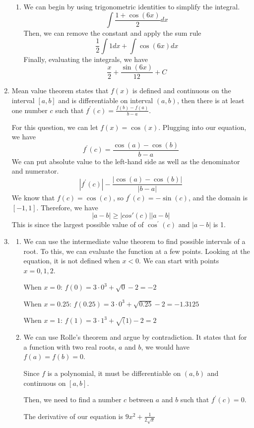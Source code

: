 \documentclass[11pt, letterpaper, twoside]{article}
\begin{document}
\begin{enumerate}
\begin{enumerate}[label=\alph*)]
\item We can begin by using trigonometric identities to simplify the integral.
\[\int\frac{1+\cos(6x)}{2}dx\]
Then, we can remove the constant and apply the sum rule
\[\frac{1}{2}\int 1dx + \int \cos(6x)dx\]
Finally, evaluating the integrals, we have 
\[\boxed{\frac{x}{2}+\frac{\sin(6x)}{12}+C}\]
\end{enumerate}
\item %
Mean value theorem states that \(f(x)\) is defined and continuous on the interval \([a, b]\) and is differentiable on interval \((a,b)\),
then there is at least one number \(c\) such that \(f^\prime(c)=\frac{f(b)-f(a)}{b-a}\).

For this question, we can let \(f(x)=\cos(x)\). 
Plugging into our equation, we have 
\[f^\prime(c)=\frac{\cos(a)-\cos(b)}{b-a}\]
We can put absolute value to the left-hand side as well as the denominator and numerator.
\[|f^\prime(c)|-\frac{|\cos(a)-\cos(b)|}{|b-a|}\]
We know that \(f(c)=\cos(c)\), so \(f^\prime(c)=-\sin(c)\), and the domain is \([-1, 1]\).
Therefore, we have 
\[|a-b|\geq |cos\prime(c)||a-b|\]
This is since the largest possible value of of \(\cos^\prime(c)\) and \(|a-b|\) is 1.

\item %
\begin{enumerate}[label=\alph*)]
\item
We can use the intermediate value theorem to find possible intervals of a root. 
To this, we can evaluate the function at a few points. 
Looking at the equation, it is not defined when \(x<0\). 
We can start with points \(x=0, 1, 2\).

When \(x=0\): \(f(0)=3\cdot0^3+\sqrt{0}-2=-2\)

When \(x=0.25\): \(f(0.25)=3\cdot0^3+\sqrt{0.25}-2=-1.3125\)

When \(x=1\): \(f(1)=3\cdot1^3+\sqrt(1)-2=2\)

\item
We can use Rolle's theorem and argue by contradiction.
It states that for a function with two real roots, \(a\) and \(b\), we would have \(f(a)=f(b)=0\).

Since \(f\) is a polynomial, it must be differentiable on \((a, b)\) and continuous on \([a,b]\).

Then, we need to find a number \(c\) between \(a\) and \(b\) such that \(f^\prime(c)=0\).

The derivative of our equation is \(9x^2+\frac{1}{2\sqrt x}\)


\end{enumerate}
\end{enumerate}
\end{document}
